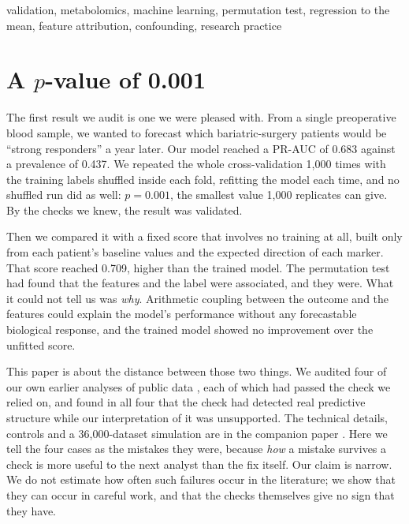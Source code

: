 \documentclass[conference]{IEEEtran}
\begin{document}
\begin{IEEEkeywords}
validation, metabolomics, machine learning, permutation test, regression to
the mean, feature attribution, confounding, research practice
\end{IEEEkeywords}

\section{A $p$-value of 0.001}
\label{sec:intro}

The first result we audit is one we were pleased with. From a single
preoperative blood sample, we wanted to forecast which bariatric-surgery
patients would be ``strong responders'' a year later. Our model reached a
PR-AUC of 0.683 against a prevalence of 0.437. We repeated the whole
cross-validation 1{,}000 times with the training labels shuffled inside each
fold, refitting the model each time, and no shuffled run did as well:
$p=0.001$, the smallest value 1{,}000 replicates can give. By the checks we
knew, the result was validated.

Then we compared it with a fixed score that involves no training at all,
built only from each patient's baseline values and the expected direction of
each marker. That score reached 0.709, higher than the trained model. The
permutation test had found that the features and the label were associated,
and they were. What it could not tell us was \emph{why}. Arithmetic coupling
between the outcome and the features could explain the model's performance
without any forecastable biological response, and the trained model showed
no improvement over the unfitted score.

This paper is about the distance between those two things. We audited four
of our own earlier analyses of public data
\cite{repo_forecast, repo_roar, repo_bridge}, each of which had passed the
check we relied on, and found in all four that the check had detected real
predictive structure while our interpretation of it was unsupported. The
technical details, controls and a 36{,}000-dataset simulation are in the
companion paper \cite{vyw}. Here we tell the four cases as the mistakes they
were, because \emph{how} a mistake survives a check is more useful to the
next analyst than the fix itself. Our claim is narrow. We do not estimate
how often such failures occur in the literature; we show that they can occur
in careful work, and that the checks themselves give no sign that they have.
\end{document}
